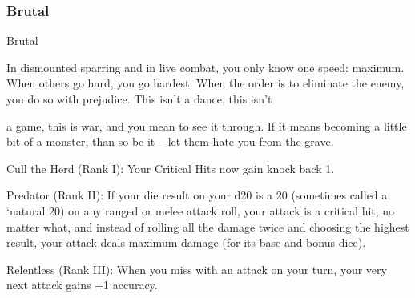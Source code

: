 \subsubsection{Brutal}

                                                      Brutal

In dismounted sparring and in live combat, you only know one speed: maximum. When others go hard, you
go hardest. When the order is to eliminate the enemy, you do so with prejudice. This isn’t a dance, this isn’t

a game, this is war, and you mean to see it through. If it means becoming a little bit of a monster, than so
be it -- let them hate you from the grave.




Cull the Herd (Rank I): Your Critical Hits now gain knock back 1.

Predator (Rank II): If your die result on your d20 is a 20 (sometimes called a ‘natural 20) on any
ranged or melee attack roll, your attack is a critical hit, no matter what, and instead of rolling all
the damage twice and choosing the highest result, your attack deals maximum damage (for its
base and bonus dice).

Relentless (Rank III): When you miss with an attack on your turn, your very next attack gains +1
accuracy.